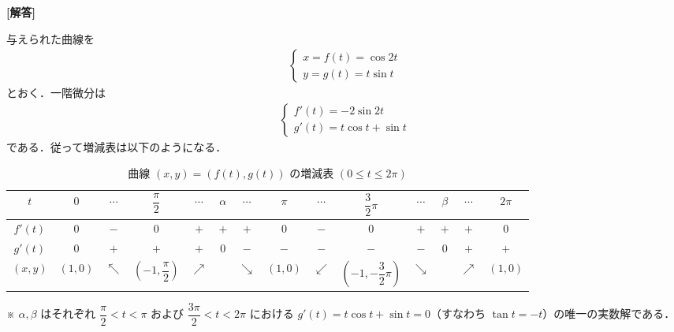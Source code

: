 \documentclass[../../main.tex]{subfiles}
\begin{document}
\begin{oframed}
  
\end{oframed}

{\bf [解答]}

与えられた曲線を
\begin{align}
  \begin{cases}
    x = f(t) = \cos2t \\
    y = g(t)=t\sin t
  \end{cases} \label{eq:1}
\end{align}
とおく．一階微分は
\begin{align}
  \begin{cases}
    f'(t)=-2\sin2t \\
    g'(t)=t\cos t + \sin t
  \end{cases} \label{eq:2}
\end{align}
である．従って増減表は以下のようになる．

\begin{table}[htb]
  \centering
  \caption{曲線 $(x, y) = (f(t), g(t))$ の増減表 $(0 \le t \le 2\pi)$}
  \label{tab:parametric_curve_monotonicity}
  \renewcommand{\arraystretch}{1.5}
  \begin{tabular}{c|c|c|c|c|c|c|c|c|c|c|c|c|c}
    \hline
    $t$ & $0$ & $\cdots$ & $\dfrac{\pi}{2}$ & $\cdots$ & $\alpha$ & $\cdots$ & $\pi$ & $\cdots$ & $\dfrac{3}{2}\pi$ & $\cdots$ & $\beta$ & $\cdots$ & $2\pi$ \\ \hline
    $f'(t)$ & $0$ & $-$ & $0$ & $+$ & $+$ & $+$ & $0$ & $-$ & $0$ & $+$ & $+$ & $+$ & $0$ \\ \hline
    $g'(t)$ & $0$ & $+$ & $+$ & $+$ & $0$ & $-$ & $-$ & $-$ & $-$ & $-$ & $0$ & $+$ & $+$ \\ \hline
    $(x, y)$ & $(1, 0)$ & $\nwarrow$ & $\left(-1, \dfrac{\pi}{2}\right)$ & $\nearrow$ & & $\searrow$ & $(1, 0)$ & $\swarrow$ & $\left(-1, -\dfrac{3}{2}\pi\right)$ & $\searrow$ & & $\nearrow$ & $(1, 0)$ \\ \hline
  \end{tabular}
  \vspace{1ex}
  \parbox{\linewidth}{\footnotesize ※ $\alpha, \beta$ はそれぞれ $\dfrac{\pi}{2} < t < \pi$ および $\dfrac{3\pi}{2} < t < 2\pi$ における $g'(t) = t\cos t + \sin t = 0$（すなわち $\tan t = -t$）の唯一の実数解である．}
\end{table}
\end{document}
